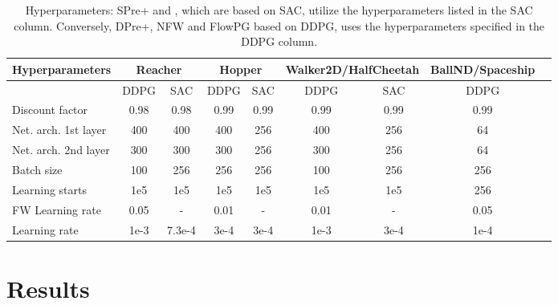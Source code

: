 {\begin{table*}[ht]
\begin{center}
\setlength\extrarowheight{2.5pt}
\begin{tabular}{l c c c c c c c c}
Hyperparameters & \multicolumn{2}{c}{Reacher}  &  \multicolumn{2}{c}{Hopper} &  \multicolumn{2}{c}{Walker2D/HalfCheetah} & BallND/Spaceship \\
\hline
& DDPG & SAC & DDPG & SAC & DDPG & SAC & DDPG  \\
Discount factor & 0.98 & 0.98 & 0.99 & 0.99 & 0.99 & 0.99 & 0.99 \\
Net. arch. 1st layer & 400 &  400 &  400 & 256 & 400 & 256 & 64  \\
Net. arch. 2nd layer & 300 &  300 &  300 & 256 & 300 & 256 & 64  \\
Batch size & 100 & 256 & 256 & 256 & 100 &  256 & 256  \\
Learning starts & 1e5 & 1e5 & 1e5 & 1e5 & 1e5 & 1e5 & 256  \\
FW Learning rate & 0.05 & - & 0.01 & - & 0.01 & - & 0.05  \\
Learning rate & 1e-3 & 7.3e-4 & 3e-4 & 3e-4 & 1e-3 & 3e-4 & 1e-4  \\
\end{tabular}
\end{center}
\caption{Hyperparameters: SPre+ and \our, which are based on SAC, utilize the hyperparameters listed in the SAC column. Conversely, DPre+, NFW and FlowPG based on DDPG, uses the hyperparameters specified in the DDPG column.}
\end{table*}
}

\section{Results}

